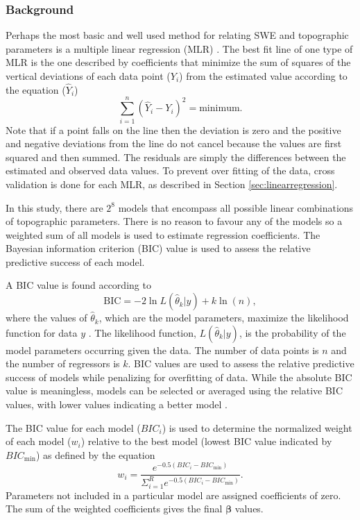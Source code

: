 \documentclass[12pt]{article}
\begin{document}
\subsubsection{Background}

Perhaps the most basic and well used method for relating SWE and topographic parameters is a multiple linear regression (MLR) \citep[e.g.][]{Cohen2013}. The best fit line of one type of MLR is the one described by coefficients that minimize the sum of squares of the vertical deviations of each data point ($Y_i$) from the estimated value according to the equation ($\hat{Y}_i$) \citep{Davis1986}
\begin{equation}
\sum^n_{i=1}(\hat{Y}_i-Y_i)^2 = \mathrm{minimum}.
\end{equation}
Note that if a point falls on the line then the deviation is zero and  the positive and negative deviations from the line do not cancel because the values are first squared and then summed. The residuals are simply the differences between the estimated and observed data values. To prevent over fitting of the data, cross validation is done for each MLR, as described in Section \ref{sec:linearregression}.

In this study, there are $2^8$ models that encompass all possible linear combinations of topographic parameters. There is no reason to favour any of the models so a weighted sum of all models is used to estimate regression coefficients. The Bayesian information criterion (BIC) value is used to assess the relative predictive success of each model. 

A BIC value is found according to
\begin{equation}
\textrm{BIC} = -2 \ln L(\hat\theta_k  | y) + k \ln(n),
\end{equation}
where the values of $\hat \theta_k$, which are the model parameters, maximize the likelihood function for data $y$ \citep{Burnham2004}. The likelihood function, $ L(\hat\theta_k  | y)$, is the probability of the model parameters occurring given the data. The number of data points is $n$ and the number of regressors is $k$. BIC values are used to assess the relative predictive success of models while penalizing for overfitting of data. While the absolute BIC value is meaningless, models can be selected or averaged using the relative BIC values, with lower values indicating a better model \citep{Burnham2004}. 

The BIC value for each model ($BIC_i$) is used to determine the normalized weight of each model ($w_i$) relative to the best model (lowest BIC value indicated by $BIC_{\min}$) as defined by the equation \citep{Burnham2004}
\begin{equation}
w_i = \frac{e^{-0.5(BIC_i-BIC_{\min})}}{\Sigma_{i=1}^R e^{-0.5(BIC_i-BIC_{\min})}}.
\label{eq:BIC}
\end{equation}
Parameters not included in a particular model are assigned coefficients of zero. The sum of the weighted coefficients gives the final $\bm{\beta}$ values.
\end{document}
